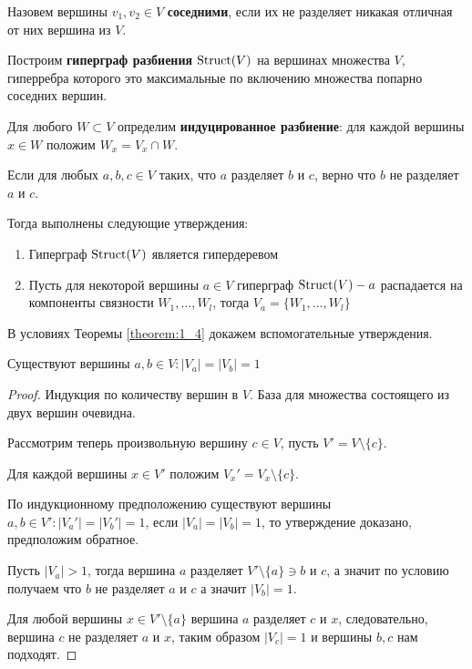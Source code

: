 \begin{df*}
	Назовем вершины $v_1,v_2 \in V$ \textbf{соседними}, если их не разделяет никакая отличная от них вершина из $V$.

	Построим \textbf{гиперграф разбиения}  $\operatorname{Struct}(V)$  на вершинах множества $V$, гиперребра которого это максимальные по включению множества попарно соседних вершин.
\end{df*}

\begin{df*}
	Для любого $W \subset V$ определим \textbf{индуцированное разбиение}: для каждой вершины $x \in W$ положим $W_x = V_x \cap W$.
\end{df*}

\begin{customthm}{1.4} \label{theorem:1_4}
	Если для любых $a, b, c \in V$ таких, что  $a$ разделяет $b$ и $c$, верно что  $b$ не разделяет $a$ и $c$.

	Тогда выполнены следующие утверждения:

	\begin{enumerate}
		\item Гиперграф $\operatorname{Struct}(V)$ является гипердеревом
		\item Пусть для некоторой вершины $a \in V$ гиперграф $\operatorname{Struct}(V) - a$ распадается на компоненты связности $W_1, \ldots, W_l$, тогда $V_a = \{W_1, \ldots, W_l\}$
	\end{enumerate}
\end{customthm}

В условиях Теоремы \ref{theorem:1_4} докажем вспомогательные утверждения.

\begin{customclaim}{1.1} \label{claim:1_1}
	Существуют вершины $a, b \in V \colon |V_a| = |V_b| = 1$
\end{customclaim}

\begin{proof}
	Индукция по количеству вершин в $V$. База для множества состоящего из двух вершин очевидна. 

	Рассмотрим теперь произвольную вершину $c \in V$, пусть  $V' = V \setminus\{c\}$.

	Для каждой вершины $x \in V'$ положим $V_x' = V_x \setminus \{c\}$.

	По индукционному предположению существуют вершины $a, b \in V' \colon |V_a'| = |V_b'| = 1$, если  $|V_a| = |V_b| = 1$, то утверждение доказано, предположим обратное.

	Пусть  $|V_a| > 1$, тогда вершина  $a$ разделяет $V' \setminus \{a\} \ni b$ и  $c$, а значит по условию получаем что $b$ не разделяет $a$ и $c$ а значит $|V_b| = 1$.

	Для любой вершины  $x \in V' \setminus \{a\}$ вершина $a$ разделяет $c$ и $x$, следовательно, вершина  $c$ не разделяет $a$ и $x$, таким образом $|V_c| = 1$ и вершины $b, c$ нам подходят. 
\end{proof}

